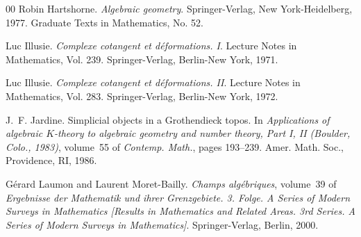\documentclass{amsart}
\numberwithin{equation}{subsection}
\theoremstyle{remark}
\theoremstyle{remark}
\begin{document}
\begin{thebibliography}{00}
 Robin Hartshorne.
\newblock \emph{Algebraic geometry}.
\newblock Springer-Verlag, New York-Heidelberg, 1977.
\newblock Graduate Texts in Mathematics, No. 52.


 Luc Illusie.
\newblock \emph{Complexe cotangent et d\'eformations. {I}}.
\newblock Lecture Notes in Mathematics, Vol. 239. Springer-Verlag, Berlin-New
  York, 1971.


 Luc Illusie.
\newblock \emph{Complexe cotangent et d\'eformations. {II}}.
\newblock Lecture Notes in Mathematics, Vol. 283. Springer-Verlag, Berlin-New
  York, 1972.


 J.~F. Jardine.
\newblock Simplicial objects in a {G}rothendieck topos.
\newblock In \emph{Applications of algebraic {$K$}-theory to algebraic geometry
  and number theory, {P}art {I}, {II} ({B}oulder, {C}olo., 1983)}, volume~55 of
  \emph{Contemp. Math.}, pages 193--239. Amer. Math. Soc., Providence, RI, 1986.





 G{\'e}rard Laumon and Laurent Moret-Bailly.
\newblock \emph{Champs alg\'ebriques}, volume~39 of \emph{Ergebnisse der
  Mathematik und ihrer Grenzgebiete. 3. Folge. A Series of Modern Surveys in
  Mathematics [Results in Mathematics and Related Areas. 3rd Series. A Series
  of Modern Surveys in Mathematics]}.
\newblock Springer-Verlag, Berlin, 2000.


\end{thebibliography}
\end{document}
